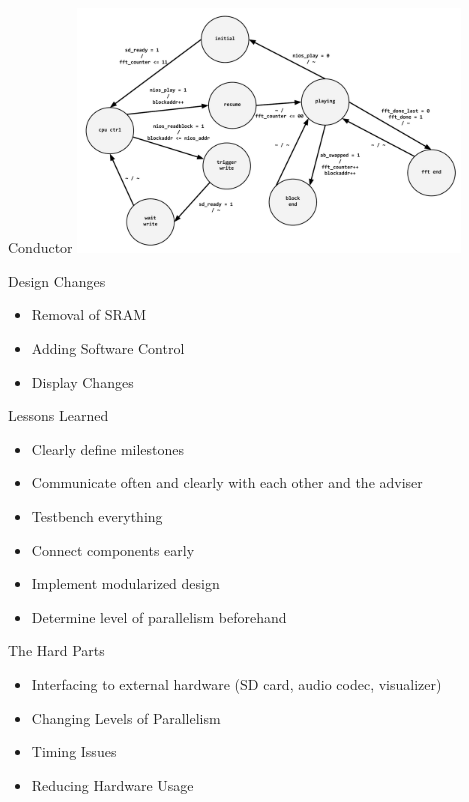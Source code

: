 \documentclass{beamer}
\begin{document}
\begin{frame}{Conductor}
	\centering
    \includegraphics[width=4in]{conductor_state}
\end{frame}

\begin{frame}{Design Changes}
	\begin{itemize}
		\item Removal of SRAM
		\item Adding Software Control
		\item Display Changes
	\end{itemize}
\end{frame}

\begin{frame}{Lessons Learned}
	\begin{itemize}
		\item Clearly define milestones
		\item Communicate often and clearly with each other and the adviser
		\item Testbench everything
		\item Connect components early
		\item Implement modularized design
		\item Determine level of parallelism beforehand
	\end{itemize}
\end{frame}

\begin{frame}{The Hard Parts}
	\begin{itemize}
		\item Interfacing to external hardware (SD card, audio codec, visualizer) 
		\item Changing Levels of Parallelism 
		\item Timing Issues
		\item Reducing Hardware Usage
	\end{itemize}
\end{frame}
\end{document}
